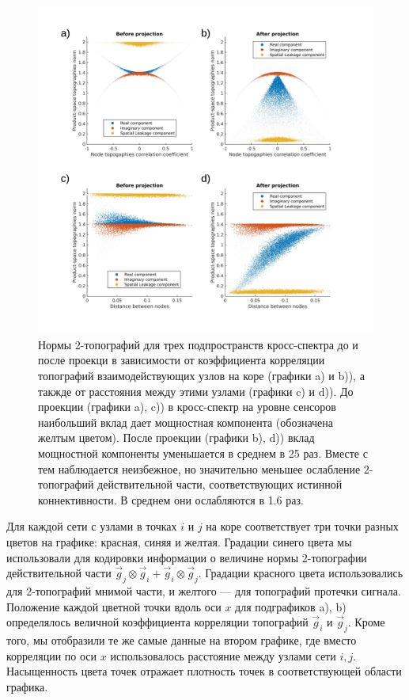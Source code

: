 \begin{figure}[!ht]
 \centering
 \includegraphics[width=18cm]{../images/psiicos_paper/Figure3abcd_hr}
 \caption{
     Нормы 2-топографий для трех подпространств кросс-спектра до и после проекци
     в зависимости от коэффициента корреляции топографий взаимодействующих
     узлов на коре (графики a) и b)), а такжде от расстояния между
     этими узлами (графики c) и d)). До проекции (графики a), c))
     в кросс-спектр на уровне сенсоров наибольший вклад дает мощностная
     компонента (обозначена желтым цветом). После проекции (графики b), d))
     вклад мощностной компоненты уменьшается в среднем в 25 раз. Вместе с
     тем наблюдается неизбежное, но значительно меньшее ослабление
     2-топографий действительной части, соответствующих истинной коннективности.
     В среднем они ослабляются в 1.6 раз.
}\label{fig:02} %
\end{figure}

Для каждой сети с узлами в точках $i$ и $j$ на коре соответствует три точки
разных цветов на графике: красная, синяя и желтая. Градации синего цвета мы использовали
для кодировки информации о величине нормы 2-топографии действительной части
$\vec{g}_j\otimes\vec{g}_i + \vec{g}_i\otimes\vec{g}_j$. Градации красного цвета использовались
для 2-топографий мнимой части, и желтого --- для топографий протечки сигнала.
Положение каждой цветной точки вдоль оси $x$ для подграфиков a), b) определялось
величной коэффициента корреляции топографий $\vec{g}_i$ и $\vec{g}_j$.
Кроме того, мы отобразили те же самые данные на втором графике, где вместо корреляции
по оси $x$ использовалось расстояние между узлами сети $i, j$. Насыщенность цвета точек
отражает плотность точек в соответствующей области графика.

